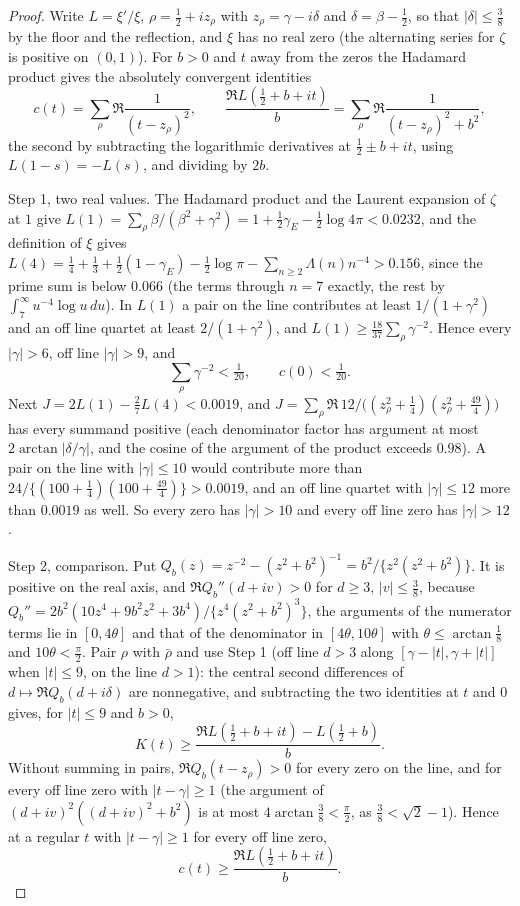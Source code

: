 \begin{proof}
Write $L=\xi'/\xi$, $\rho=\tfrac12+iz_\rho$ with $z_\rho=\gamma-i\delta$ and $\delta=\beta-\tfrac12$, so that $|\delta|\le\tfrac38$ by the floor and the reflection, and $\xi$ has no real zero (the alternating series for $\zeta$ is positive on $(0,1)$). For $b>0$ and $t$ away from the zeros the Hadamard product gives the absolutely convergent identities
\[
c(t)=\sum_\rho\Re\frac1{(t-z_\rho)^2},\qquad\frac{\Re L(\tfrac12+b+it)}b=\sum_\rho\Re\frac1{(t-z_\rho)^2+b^2},
\]
the second by subtracting the logarithmic derivatives at $\tfrac12\pm b+it$, using $L(1-s)=-L(s)$, and dividing by $2b$.

Step 1, two real values. The Hadamard product and the Laurent expansion of $\zeta$ at $1$ give $L(1)=\sum_\rho\beta/(\beta^2+\gamma^2)=1+\tfrac12\gamma_E-\tfrac12\log4\pi<0.0232$, and the definition of $\xi$ gives $L(4)=\tfrac14+\tfrac13+\tfrac12(1-\gamma_E)-\tfrac12\log\pi-\sum_{n\ge2}\Lambda(n)n^{-4}>0.156$, since the prime sum is below $0.066$ (the terms through $n=7$ exactly, the rest by $\int_7^\infty u^{-4}\log u\,du$). In $L(1)$ a pair on the line contributes at least $1/(1+\gamma^2)$ and an off line quartet at least $2/(1+\gamma^2)$, and $L(1)\ge\tfrac{18}{37}\sum_\rho\gamma^{-2}$. Hence every $|\gamma|>6$, off line $|\gamma|>9$, and
\[
\sum_\rho\gamma^{-2}<\tfrac1{20},\qquad c(0)<\tfrac1{20}.
\]
Next $J=2L(1)-\tfrac27L(4)<0.0019$, and $J=\sum_\rho\Re\,12/\big((z_\rho^2+\tfrac14)(z_\rho^2+\tfrac{49}4)\big)$ has every summand positive (each denominator factor has argument at most $2\arctan|\delta/\gamma|$, and the cosine of the argument of the product exceeds $0.98$). A pair on the line with $|\gamma|\le10$ would contribute more than $24/\{(100+\tfrac14)(100+\tfrac{49}4)\}>0.0019$, and an off line quartet with $|\gamma|\le12$ more than $0.0019$ as well. So every zero has $|\gamma|>10$ and every off line zero has $|\gamma|>12$.

Step 2, comparison. Put $Q_b(z)=z^{-2}-(z^2+b^2)^{-1}=b^2/\{z^2(z^2+b^2)\}$. It is positive on the real axis, and $\Re Q_b''(d+iv)>0$ for $d\ge3$, $|v|\le\tfrac38$, because $Q_b''=2b^2(10z^4+9b^2z^2+3b^4)/\{z^4(z^2+b^2)^3\}$, the arguments of the numerator terms lie in $[0,4\theta]$ and that of the denominator in $[4\theta,10\theta]$ with $\theta\le\arctan\tfrac18$ and $10\theta<\tfrac\pi2$. Pair $\rho$ with $\bar\rho$ and use Step 1 (off line $d>3$ along $[\gamma-|t|,\gamma+|t|]$ when $|t|\le9$, on the line $d>1$): the central second differences of $d\mapsto\Re Q_b(d+i\delta)$ are nonnegative, and subtracting the two identities at $t$ and $0$ gives, for $|t|\le9$ and $b>0$,
\[
K(t)\ge\frac{\Re L(\tfrac12+b+it)-L(\tfrac12+b)}b.
\]
Without summing in pairs, $\Re Q_b(t-z_\rho)>0$ for every zero on the line, and for every off line zero with $|t-\gamma|\ge1$ (the argument of $(d+iv)^2((d+iv)^2+b^2)$ is at most $4\arctan\tfrac38<\tfrac\pi2$, as $\tfrac38<\sqrt2-1$). Hence at a regular $t$ with $|t-\gamma|\ge1$ for every off line zero,
\[
c(t)\ge\frac{\Re L(\tfrac12+b+it)}b.
\]


\end{proof}
